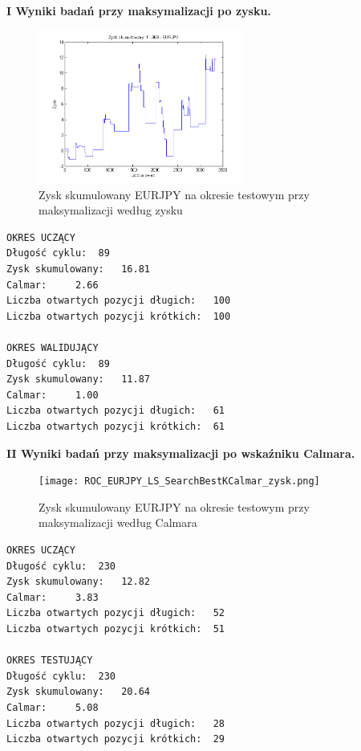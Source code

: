 \documentclass[12pt,a4paper]{article}
\begin{document}
\noindent \textbf{I Wyniki badań przy maksymalizacji po zysku.}\\
\begin{figure}[h!]
\centering
\includegraphics[width = 0.6\textwidth]{ROC_EURJPY_LS_SearchBestK_zysk.png}
\caption{Zysk skumulowany EURJPY na okresie testowym przy maksymalizacji według zysku}
\end{figure}
\FloatBarrier
\begin{verbatim}
OKRES UCZĄCY
Długość cyklu: 	89
Zysk skumulowany: 	16.81
Calmar: 	2.66
Liczba otwartych pozycji długich: 	100
Liczba otwartych pozycji krótkich: 	100

OKRES WALIDUJĄCY
Długość cyklu: 	89
Zysk skumulowany: 	11.87
Calmar: 	1.00
Liczba otwartych pozycji długich: 	61
Liczba otwartych pozycji krótkich: 	61
\end{verbatim}
\newpage
\textbf{II Wyniki badań przy maksymalizacji po wskaźniku Calmara.}\\
\begin{figure}[h!]
\centering
\texttt{[image: ROC\_EURJPY\_LS\_SearchBestKCalmar\_zysk.png]}
\caption{Zysk skumulowany EURJPY na okresie testowym przy maksymalizacji według Calmara}
\end{figure}
\FloatBarrier
\begin{verbatim}
OKRES UCZĄCY
Długość cyklu: 	230
Zysk skumulowany: 	12.82
Calmar: 	3.83
Liczba otwartych pozycji długich: 	52
Liczba otwartych pozycji krótkich: 	51

OKRES TESTUJĄCY
Długość cyklu: 	230
Zysk skumulowany: 	20.64
Calmar: 	5.08
Liczba otwartych pozycji długich: 	28
Liczba otwartych pozycji krótkich: 	29
\end{verbatim}
\end{document}
